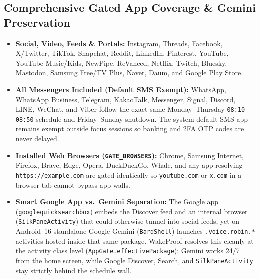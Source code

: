 \documentclass[11pt,a4paper]{article}
\begin{document}
\subsection{Comprehensive Gated App Coverage \& Gemini Preservation}
\begin{itemize}
  \item \textbf{Social, Video, Feeds \& Portals:} Instagram, Threads, Facebook, X/Twitter, TikTok, Snapchat, Reddit, LinkedIn, Pinterest, YouTube, YouTube Music/Kids, NewPipe, ReVanced, Netflix, Twitch, Bluesky, Mastodon, Samsung Free/TV Plus, Naver, Daum, and Google Play Store.
  \item \textbf{All Messengers Included (Default SMS Exempt):} WhatsApp, WhatsApp Business, Telegram, KakaoTalk, Messenger, Signal, Discord, LINE, WeChat, and Viber follow the exact same Monday--Thursday \texttt{08:10--08:50} schedule and Friday--Sunday shutdown. The system default SMS app remains exempt outside focus sessions so banking and 2FA OTP codes are never delayed.
  \item \textbf{Installed Web Browsers (\texttt{GATE\_BROWSERS}):} Chrome, Samsung Internet, Firefox, Brave, Edge, Opera, DuckDuckGo, Whale, and any app resolving \texttt{https://example.com} are gated identically so \texttt{youtube.com} or \texttt{x.com} in a browser tab cannot bypass app walls.
  \item \textbf{Smart Google App vs.\ Gemini Separation:} The Google app (\texttt{googlequicksearchbox}) embeds the Discover feed and an internal browser (\texttt{SilkPaneActivity}) that could otherwise tunnel into social feeds, yet on Android~16 standalone Google Gemini (\texttt{BardShell}) launches \texttt{.voice.robin.*} activities hosted inside that same package. WakeProof resolves this cleanly at the activity class level (\texttt{AppGate.effectivePackage}): Gemini works 24/7 from the home screen, while Google Discover, Search, and \texttt{SilkPaneActivity} stay strictly behind the schedule wall.
\end{itemize}
\end{document}
